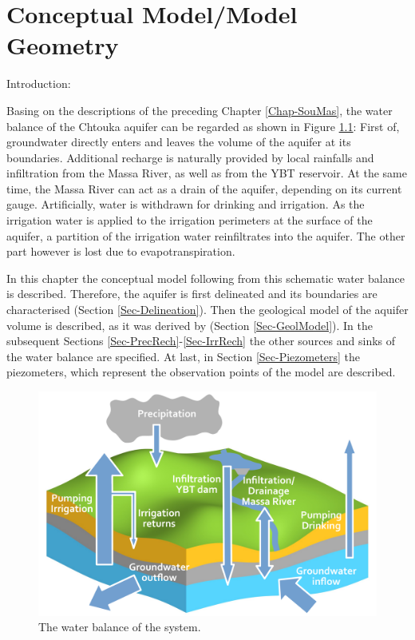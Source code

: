 
\chapter{Conceptual Model/Model Geometry}
\label{Chap-ConcMod}

Introduction:

Basing on the descriptions of the preceding Chapter \ref{Chap-SouMas}, the water balance of the Chtouka aquifer can be regarded as shown in Figure \ref{Fig-SchemeBalance}: First of, groundwater directly enters and leaves the volume of the aquifer at its boundaries. Additional recharge is naturally provided by local rainfalls and infiltration from the Massa River, as well as from the YBT reservoir. At the same time, the Massa River can act as a drain of the aquifer, depending on its current gauge. Artificially, water is withdrawn for drinking and irrigation. As the irrigation water is applied to the irrigation perimeters at the surface of the aquifer, a partition of the irrigation water reinfiltrates into the aquifer. The other part however is lost due to evapotranspiration.

In this chapter the conceptual model following from this schematic water balance is described. Therefore, the aquifer is first delineated and its boundaries are characterised (Section \ref{Sec-Delineation}). Then the geological model of the aquifer volume is described, as it was derived by \textcite{Horn.2021} (Section \ref{Sec-GeolModel}). In the subsequent Sections \ref{Sec-PrecRech}-\ref{Sec-IrrRech} the other sources and sinks of the water balance are specified. At last, in Section \ref{Sec-Piezometers} the piezometers, which represent the observation points of the model are described.

\begin{figure}[h]
    \centering
    \includegraphics[width=1.0\textwidth]{./img/Fig-SchematicBalanceSystem.pdf}
    \caption{The water balance of the system.}
    \label{Fig-SchemeBalance}
\end{figure}

